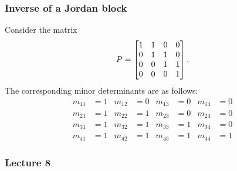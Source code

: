 \documentclass[9pt]{beamer}
\begin{document}
\begin{frame}[t]
 \frametitle{Inverse of a Jordan block}
 
 Consider the matrix
 \[ P = \left[\begin{matrix} 1&1&0&0 \\ 0&1&1&0 \\ 0&0&1&1 \\ 0&0&0&1 \end{matrix}\right]. \]
 The corresponding minor determinants are as follows:
 \begin{align*}
  m_{11} &= 1 &
  m_{12} &= 0 &
  m_{13} &= 0 &
  m_{14} &= 0 \\
  m_{21} &= 1 &
  m_{22} &= 1 &
  m_{23} &= 0 &
  m_{24} &= 0 \\
  m_{31} &= 1 &
  m_{32} &= 1 &
  m_{33} &= 1 &
  m_{34} &= 0 \\
  m_{41} &= 1 &
  m_{42} &= 1 &
  m_{43} &= 1 &
  m_{44} &= 1
 \end{align*}
\end{frame}

\begin{frame}\frametitle{Lecture 8}\end{frame}
\end{document}
